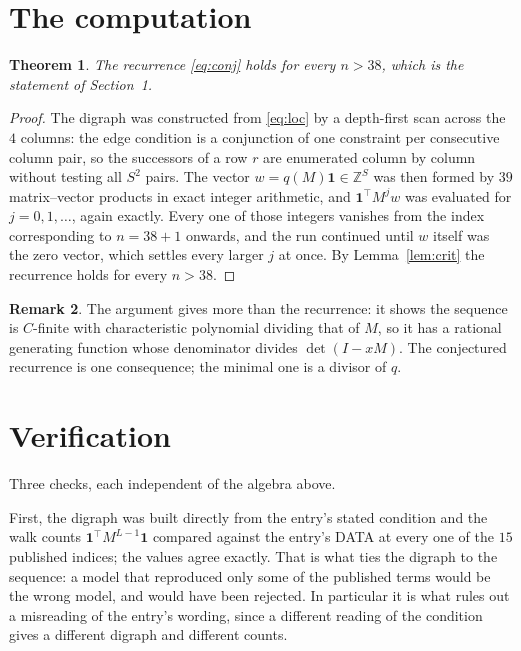 \documentclass[11pt,a4paper]{article}
\theoremstyle{plain}
\newtheorem{theorem}{Theorem}
\theoremstyle{definition}
\newtheorem{remark}[theorem]{Remark}
\begin{document}
\section{The computation}

\begin{theorem}
The recurrence \eqref{eq:conj} holds for every $n>38$, which is the statement of
Section~1.
\end{theorem}

\begin{proof}
The digraph was constructed from \eqref{eq:loc} by a depth-first scan across the $4$
columns: the edge condition is a conjunction of one constraint per consecutive column
pair, so the successors of a row $r$ are enumerated column by column without testing all
$S^2$ pairs. The vector $w=q(M)\mathbf{1}\in\mathbb{Z}^{S}$ was then formed by $39$
matrix--vector products in exact integer arithmetic, and $\mathbf{1}^{\!\top}M^{j}w$ was
evaluated for $j=0,1,\dots$, again exactly. Every one of those integers vanishes from the
index corresponding to $n=38+1$ onwards, and the run continued until $w$ itself was the
zero vector, which settles every larger $j$ at once. By Lemma~\ref{lem:crit} the recurrence
holds for every $n>38$.
\end{proof}

\begin{remark}
The argument gives more than the recurrence: it shows the sequence is $C$-finite with
characteristic polynomial dividing that of $M$, so it has a rational generating function
whose denominator divides $\det(I-xM)$. The conjectured recurrence is one consequence; the
minimal one is a divisor of $q$.
\end{remark}

\section{Verification}

Three checks, each independent of the algebra above.

First, the digraph was built directly from the entry's stated condition and the walk counts
$\mathbf{1}^{\!\top}M^{L-1}\mathbf{1}$ compared against the entry's DATA at
every one of the $15$ published indices; the values agree exactly. That is what ties
the digraph to the sequence: a model that reproduced only some of the published terms would
be the wrong model, and would have been rejected. In particular it is what rules out a
misreading of the entry's wording, since a different reading of the condition gives a
different digraph and different counts.
\end{document}

